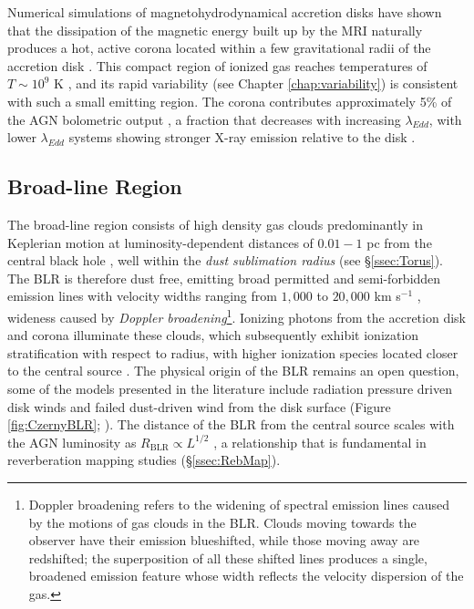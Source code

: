 Numerical simulations of magnetohydrodynamical accretion disks have shown that the dissipation of the magnetic energy built up by the MRI naturally produces a hot, active corona located within a few gravitational radii of the accretion disk \parencites{Balbus1998TurbulenceAccretionD}{Miller2000MagnetoCorona}{Fabian2009Corona}. This compact region of ionized gas reaches temperatures of $T \sim 10^9$ K \parencite{Kara2025SMBHXRayReview}, and its rapid variability (see Chapter \ref{chap:variability}) is consistent with such a small emitting region. The corona contributes approximately 5\% of the AGN bolometric output \parencite{Ricci2026unificationmodelsactivegalactic}, a fraction that decreases with increasing $\lambda_{Edd}$, with lower $\lambda_{Edd}$ systems showing stronger X-ray emission relative to the disk \parencite{Padovani2017whatisaname}.
\subsection{Broad-line Region}
\label{ssec:BLR}

The broad-line region consists of high density gas clouds predominantly in Keplerian motion at luminosity-dependent distances of $0.01-1$ pc from the central black hole \parencite{Netzer2015AnnRev}, well within the \textit{dust sublimation radius} (see \S \ref{ssec:Torus}). The BLR is therefore dust free, emitting broad permitted and semi-forbidden emission lines with velocity widths ranging from $1,000$ to $20,000$ km s$^{-1}$ \parencite{Ricci2026unificationmodelsactivegalactic}, wideness caused by \textit{Doppler broadening}\footnote{Doppler broadening refers to the widening of spectral emission lines caused by the motions of gas clouds in the BLR. Clouds moving towards the observer have their emission blueshifted, while those moving away are redshifted; the superposition of all these shifted lines produces a single, broadened emission feature whose width reflects the velocity dispersion of the gas.}. Ionizing photons from the accretion disk and corona illuminate these clouds, which subsequently exhibit ionization stratification with respect to radius, with higher ionization species located closer to the central source \parencite{Netzer2013PhyEvolofAGNBook}. The physical origin of the BLR remains an open question, some of the models presented in the literature include radiation pressure driven disk winds \parencite{Murray1995DiskWindBLR} and failed dust-driven wind from the disk surface (Figure \ref{fig:CzernyBLR}; \cite{Czerny2011WindOriginBLR}). 
The distance of the BLR from the central source scales with the AGN luminosity as $R_\mathrm{BLR} \propto L^{1/2}$ \parencite{Kaspi2000BLRSScalingL}, a relationship that is fundamental in reverberation mapping studies (\S \ref{ssec:RebMap}).

